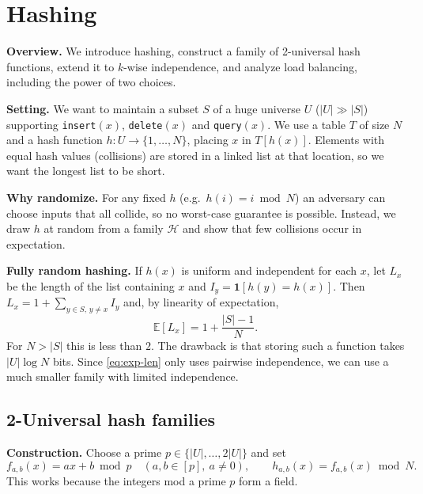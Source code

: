 % 

\section{Hashing}
 
\textbf{Overview.} We introduce hashing, construct a family of 2-universal hash functions, extend it to $k$-wise independence, and analyze load balancing, including the power of two choices.
  
\textbf{Setting.} We want to maintain a subset $S$ of a huge universe $U$ ($|U|\gg|S|$) supporting \texttt{insert}$(x)$, \texttt{delete}$(x)$ and \texttt{query}$(x)$. We use a table $T$ of size $N$ and a hash function $h:U\to\{1,\ldots,N\}$, placing $x$ in $T[h(x)]$. Elements with equal hash values (collisions) are stored in a linked list at that location, so we want the longest list to be short.
 
\textbf{Why randomize.} For any fixed $h$ (e.g.\ $h(i)=i \bmod N$) an adversary can choose inputs that all collide, so no worst-case guarantee is possible. Instead, we draw $h$ at random from a family $\mathcal{H}$ and show that few collisions occur in expectation.
 
\textbf{Fully random hashing.} If $h(x)$ is uniform and independent for each $x$, let $L_x$ be the length of the list containing $x$ and $I_y=\mathbf 1[h(y)=h(x)]$. Then $L_x=1+\sum_{y\in S,\,y\neq x}I_y$ and, by linearity of expectation,
\begin{equation}\label{eq:exp-len}
  \mathbb{E}[L_x]=1+\frac{|S|-1}{N}.
\end{equation}
For $N>|S|$ this is less than $2$. The drawback is that storing such a function takes $|U|\log N$ bits. Since \eqref{eq:exp-len} only uses pairwise independence, we can use a much smaller family with limited independence.
 
\subsection{2-Universal hash families}
 
 
\textbf{Construction.} Choose a prime $p\in\{|U|,\ldots,2|U|\}$ and set
\[
  f_{a,b}(x)=ax+b \bmod p\quad(a,b\in[p],\ a\neq0),\qquad h_{a,b}(x)=f_{a,b}(x)\bmod N.
\]
This works because the integers mod a prime $p$ form a field.
 
